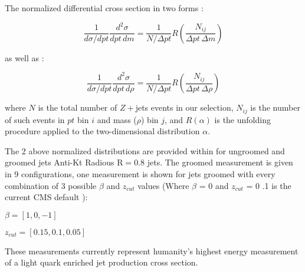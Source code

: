 The normalized differential cross section in two forms :

\begin{equation}
\frac{1}{d\sigma/dpt}\frac{d^2\sigma}{dpt\,dm} = \frac{1}{N/\Delta pt} R(\frac{N_{ij}}{ \Delta pt \,\Delta m} )
\end{equation}


as well as :

\begin{equation}
\frac{1}{d\sigma/dpt}\frac{d^2\sigma}{dpt\,d\rho} = \frac{1}{N/\Delta pt} R(\frac{N_{ij}}{ \Delta pt \,\Delta \rho} )
\end{equation}


where $N$ is the total number of $Z+$jets events in our selection,
$N_{ij}$ is the number of such events in $pt$ bin $i$ and mass ($\rho$) bin $j$,
and $R(\alpha)$ is the unfolding procedure applied to the two-dimensional
distribution $\alpha$.

The 2 above normalized distributions are provided within for ungroomed  and groomed jets Anti-Kt Radious R$= 0.8$ jets. The groomed measurement is given in 9 configurations, one measurement is shown for jets groomed with every combination of 3 possible $\beta$ and $z_{cut}$ values (Where $\beta$ = 0 and $z_{cut}$ = 0 .1 is the current CMS default ):


$ \beta = [ 1,  0 , -1 ]  $

$ z_{cut}  = [ 0.15, 0.1, 0.05 ] $ 


These measurements currently represent humanity's highest energy measurement of a light quark enriched jet production cross section.

